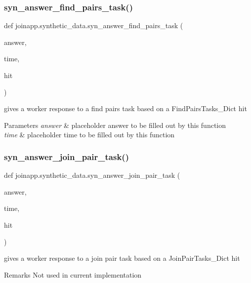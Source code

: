 \subsubsection{\texorpdfstring{syn\_answer\_find\_pairs\_task()}{syn\_answer\_find\_pairs\_task()}}
{\footnotesize\ttfamily def joinapp.\+synthetic\+\_\+data.\+syn\+\_\+answer\+\_\+find\+\_\+pairs\+\_\+task (\begin{DoxyParamCaption}\item[{}]{answer,  }\item[{}]{time,  }\item[{}]{hit }\end{DoxyParamCaption})}



gives a worker response to a find pairs task based on a Find\+Pairs\+Tasks\+\_\+\+Dict hit 


\begin{DoxyParams}{Parameters}
{\em answer} & placeholder answer to be filled out by this function \\
\hline
{\em time} & placeholder time to be filled out by this function \\
\hline
\end{DoxyParams}
\mbox{\label{namespacejoinapp_1_1synthetic__data_a5085597abd3e5d1c9a0487ffeef2d142}} 
\subsubsection{\texorpdfstring{syn\_answer\_join\_pair\_task()}{syn\_answer\_join\_pair\_task()}}
{\footnotesize\ttfamily def joinapp.\+synthetic\+\_\+data.\+syn\+\_\+answer\+\_\+join\+\_\+pair\+\_\+task (\begin{DoxyParamCaption}\item[{}]{answer,  }\item[{}]{time,  }\item[{}]{hit }\end{DoxyParamCaption})}



gives a worker response to a join pair task based on a Join\+Pair\+Tasks\+\_\+\+Dict hit 

\begin{DoxyRemark}{Remarks}
Not used in current implementation 
\end{DoxyRemark}

